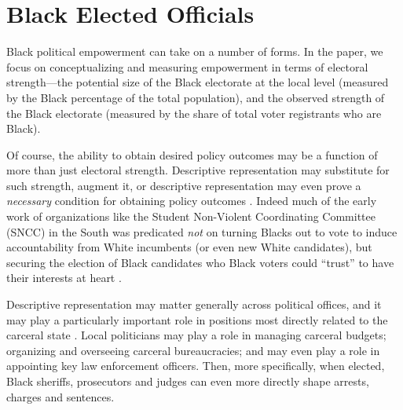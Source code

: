 \documentclass[12pt]{article}
\begin{document}
\section{Black Elected Officials}\label{appendix_beo}
\setcounter{table}{0}
\setcounter{figure}{0}
\renewcommand{\thetable}{H\arabic{table}}
\renewcommand{\thefigure}{H\arabic{figure}}
\normalsize


Black political empowerment can take on a number of forms.  In the paper, we focus on conceptualizing and measuring empowerment in terms of electoral strength---the potential size of the Black electorate at the local level (measured by the Black percentage of the total population), and the observed strength of the Black electorate (measured by the share of total voter registrants who are Black).

Of course, the ability to obtain desired policy outcomes may be a function of more than just electoral strength.  Descriptive representation may substitute for such strength, augment it, or descriptive representation may even prove a \emph{necessary} condition for obtaining policy outcomes .  Indeed much of the early work of organizations like the Student Non-Violent Coordinating Committee (SNCC) in the South was predicated \emph{not} on turning Blacks out to vote to induce accountability from White incumbents (or even new White candidates), but securing the election of Black candidates who Black voters could ``trust'' to have their interests at heart .

Descriptive representation may matter generally across political offices, and it may play a particularly important role in positions most directly related to the carceral state .  Local politicians may play a role in managing carceral budgets; organizing and overseeing carceral bureaucracies; and may even play a role in appointing key law enforcement officers.  Then, more specifically, when elected, Black sheriffs, prosecutors and judges can even more directly shape arrests, charges and sentences.
\end{document}
